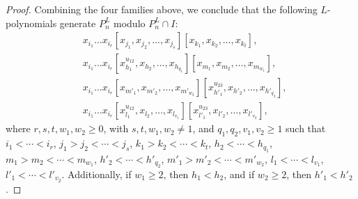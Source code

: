 \documentclass[10pt,a4paper]{amsart}
\begin{document}
\begin{proof}
Combining the four families above, we conclude that the following $L$-polynomials generate
$P_n^L$ modulo $P_n^L\cap I$:
\begin{equation}\label{No IdUT_3^e_1-e_2}
\begin{split}
&x_{i_1}\dots x_{i_r}[x_{j_1},x_{j_2},\dots,x_{j_s}][x_{k_1},x_{k_2},\dots,x_{k_t}],\\
&x_{i_1}\dots x_{i_r}[x_{h_1}^{u_{12}},x_{h_2},\dots,x_{h_{q_1}}][x_{m_1},x_{m_2},\dots,x_{m_{w_1}}],\\
&x_{i_1}\dots x_{i_r}[x_{m'_1},x_{m'_2},\dots,x_{m'_{w_2}}][x_{h'_1}^{u_{23}},x_{h'_2},\dots,x_{h'_{q_2}}],\\
&x_{i_1}\dots x_{i_r}[x_{l_1}^{u_{12}},x_{l_2},\dots,x_{l_{v_1}}][x_{l'_1}^{u_{23}},x_{l'_2},\dots,x_{l'_{v_2}}],
\end{split}
\end{equation}
where $r,s,t,w_1,w_2\ge0$, with $s,t,w_1,w_2\ne1$, and $q_1,q_2,v_1,v_2\ge1$ such that
$i_1<\cdots<i_r$, $j_1>j_2<\cdots<j_s$, $k_1>k_2<\cdots<k_t$, $h_2<\cdots<h_{q_1}$,
$m_1>m_2<\cdots<m_{w_1}$, $h'_2<\cdots<h'_{q_2}$, $m'_1>m'_2<\cdots<m'_{w_2}$,
$l_1<\cdots<l_{v_1}$, $l'_1<\cdots<l'_{v_2}$. Additionally, if $w_1\ge2$, then $h_1<h_2$, and if
$w_2\ge2$, then $h'_1<h'_2$.



\end{proof}
\end{document}

